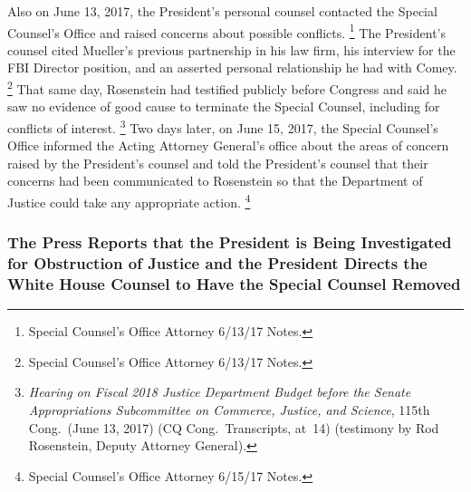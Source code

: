 {Also on June 13, 2017, the President's personal counsel contacted the Special Counsel's Office and raised concerns about possible conflicts.%
\footnote{Special Counsel's Office Attorney 6/13/17 Notes.}
The President's counsel cited Mueller's previous partnership in his law firm, his interview for the FBI Director position, and an asserted personal relationship he had with Comey.%
\footnote{Special Counsel's Office Attorney 6/13/17 Notes.}
That same day, Rosenstein had testified publicly before Congress and said he saw no evidence of good cause to terminate the Special Counsel, including for conflicts of interest.%
\footnote{\textit{Hearing on Fiscal 2018 Justice Department Budget before the Senate Appropriations Subcommittee on Commerce, Justice, and Science}, 115th Cong.\ (June 13, 2017) (CQ Cong.\ Transcripts, at~14) (testimony by Rod Rosenstein, Deputy Attorney General).}
Two days later, on June 15, 2017, the Special Counsel's Office informed the Acting Attorney General's office about the areas of concern raised by the President's counsel and told the President's counsel that their concerns had been communicated to Rosenstein so that the Department of Justice could take any appropriate action.%
\footnote{Special Counsel's Office Attorney 6/15/17 Notes.}

\subsubsection{The Press Reports that the President is Being Investigated for Obstruction of Justice and the President Directs the White House Counsel to Have the Special Counsel Removed}

}
